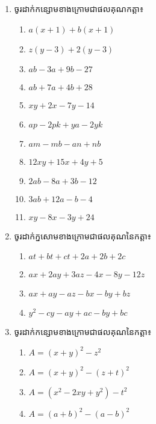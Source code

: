 \begin{enumerate}
\item ចូរដាក់កន្សោមខាងក្រោមជាផលគុណកត្តា៖
\begin{multicols}{3}
\begin{enumerate}[label=\alph*.]
\item $a(x+1)+b(x+1)$
\item $z(y-3)+2(y-3)$
\item $ab-3a+9b-27$
\item $ab+7a+4b+28$
\item $xy+2x-7y-14$
\item $ap-2pk+ya-2yk$
\item $am-mb-an+nb$
\item $12xy+15x+4y+5$
\item $2ab-8a+3b-12$
\item $3ab+12a-b-4$
\item $xy-8x-3y+24$
\end{enumerate}
\end{multicols}

\item ចូរដាក់ក្នសោមខាងក្រោមជាផលគុណនៃកត្តា៖
\begin{multicols}{2}
\begin{enumerate}[label=\alph*.]
\item $at+bt+ct+2a+2b+2c$
\item $ax+2ay+3az-4x-8y-12z$
\item $ax+ay-az-bx-by+bz$
\item $y^2-cy-ay+ac-by+bc$
\end{enumerate}
\end{multicols}

\item ចូរដាក់កន្សោមខាងក្រោមជាផលគុណនៃកត្តា៖
\begin{multicols}{2}
\begin{enumerate}[label=\alph*.]
\item $A=(x+y)^2-z^2$
\item $A=(x+y)^2-(z+t)^2$
\item $A=(x^2-2xy+y^2)-t^2$
\item $A=(a+b)^2-(a-b)^2$
\end{enumerate}
\end{multicols}


\end{enumerate}
